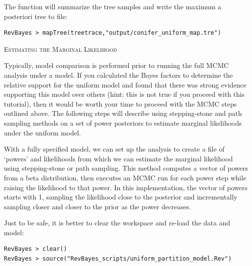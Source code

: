 The  function will summarize the tree samples and write the maximum a posteriori tree to file:
{\tt \begin{snugshade*}
\begin{lstlisting}
RevBayes > mapTree(treetrace,"output/conifer_uniform_map.tre")
\end{lstlisting}
\end{snugshade*}}



\bigskip
{\large \textcolor{mycol}{\textsc{Estimating the Marginal Likelihood}}}

Typically, model comparison is performed prior to running the full MCMC analysis under a model. 
If you calculated the Bayes factors to determine the relative support for the uniform model and found that there was strong evidence supporting this model over others (hint: this is not true if you proceed with this tutorial), then it would be worth your time to proceed with the MCMC steps outlined above. 
The following steps will describe using stepping-stone and path sampling methods on a set of power posteriors to estimate marginal likelihoods under the uniform model. 

With a fully specified model, we can set up the  analysis to create a file of `powers' and likelihoods from which we can estimate the marginal likelihood using stepping-stone or path sampling. 
This method computes a vector of powers from a beta distribution, then executes an MCMC run for each power step while raising the likelihood to that power. In this implementation, the vector of powers starts with 1, sampling the likelihood close to the posterior and incrementally sampling closer and closer to the prior as the power decreases. 




Just to be safe, it is better to clear the workspace and re-load the data and model:
{\tt \begin{snugshade*}
\begin{lstlisting}
RevBayes > clear()
RevBayes > source("RevBayes_scripts/uniform_partition_model.Rev")
\end{lstlisting}
\end{snugshade*}}


